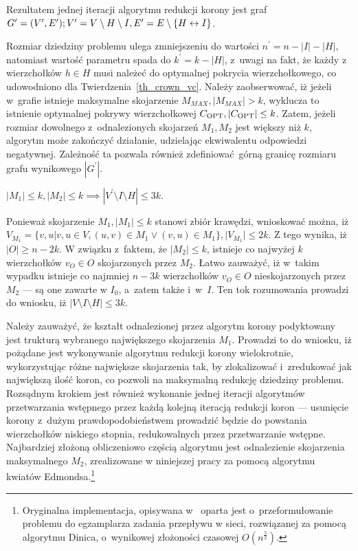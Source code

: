 \par{
  Rezultatem jednej iteracji algorytmu redukcji korony jest graf
  $G^\prime=(V^\prime, E^\prime);\\V^\prime=V\setminus H \setminus I, E^\prime = E
  \setminus \{H\leftrightarrow I\}$.

  Rozmiar dziedziny problemu ulega zmniejszeniu do wartości
  $n^\prime=n-|I|-|H|$, natomiast wartość parametru spada do $k^\prime=k-|H|$,
  z~uwagi na fakt, że każdy z wierzchołków $h \in H$ musi należeć do optymalnej
  pokrycia wierzchołkowego, co udowodniono dla Twierdzenia~\ref{th_crown_vc}.
  Należy zaobserwować, iż jeżeli w~grafie istnieje maksymalne skojarzenie
  $M_{MAX}, |M_{MAX}| > k$, wyklucza to istnienie optymalnej pokrywy
  wierzchołkowej $C_{\textnormal{OPT}}, |C_{\textnormal{OPT}}|\leq k$.
  Zatem, jeżeli rozmiar dowolnego z~odnalezionych skojarzeń $M_1, M_2$ jest
  większy niż $k$, algorytm może zakończyć działanie, udzielając ekwiwalentu 
  odpowiedzi negatywnej.
  Zależność ta pozwala również zdefiniować górną granicę rozmiaru grafu 
  wynikowego $|G^\prime|$.
}
\begin{theorem}
  $|M_1| \leq k, |M_2| \leq k \implies |V^\prime \setminus I \setminus H|
  \leq 3k$.
\end{theorem}
\begin{bproof}
  Ponieważ skojarzenie $M_1, |M_1| \leq k$ stanowi zbiór krawędzi, wnioskować
  można, iż $V_{M_1}=\{v, u|v, u \in V, (u,v)\in M_1 \lor (v,u) \in M_1\}, |V_{M_1}| \leq
  2k$.
  Z tego wynika, iż $|O| \geq n-2k$.
  W związku z~faktem, że $|M_2| \leq k$, istnieje co najwyżej $k$ wierzchołków
  $v_O \in O$ skojarzonych przez $M_2$.
  Łatwo zauważyć, iż w~takim wypadku istnieje co najmniej $n-3k$ wierzchołków
  $v_O \in O$ nieskojarzonych przez $M_2$ --- są one zawarte w $I_0$, a~zatem
  także i~w~$I$.
  Ten tok rozumowania prowadzi do wniosku, iż $|V \setminus I \setminus H|
  \leq 3k$.
\end{bproof}
\par{
  Należy zauważyć, że kształt odnalezionej przez algorytm korony podyktowany
  jest trukturą wybranego największego skojarzenia $M_1$.
  Prowadzi to do wniosku, iż pożądane jest wykonywanie algorytmu redukcji korony
  wielokrotnie, wykorzystując różne największe skojarzenia tak, by zlokalizować 
  i~zredukować jak największą ilość koron, co pozwoli na maksymalną redukcję
  dziedziny problemu.
  Rozsądnym krokiem jest również wykonanie jednej iteracji algorytmów 
  przetwarzania wstępnego przez każdą kolejną iteracją redukcji 
  koron --- usunięcie korony z~dużym prawdopodobieństwem prowadzić będzie do 
  powstania wierzchołków niskiego stopnia, redukowalnych przez przetwarzanie
  wstępne.
  Najbardziej złożoną obliczeniowo częścią algorytmu jest odnalezienie
  skojarzenia maksymalnego $M_2$, zrealizowane w niniejszej pracy za pomocą 
  algorytmu kwiatów Edmondsa.\footnote{
    Oryginalna implementacja, opisywana
    w~\cite{KernelizationAlgorithms04} oparta jest o~przeformułowanie problemu do
    egzamplarza zadania przepływu w sieci, rozwiązanej za pomocą algorytmu Dinica,
    o~wynikowej złożoności czasowej $O(n^{\frac{5}{2}})$.
  }
}

